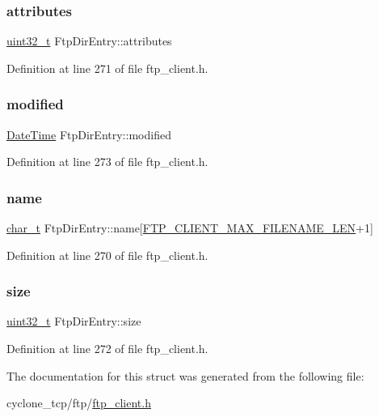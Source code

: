 \subsubsection{\texorpdfstring{attributes}{attributes}}
{\footnotesize\ttfamily \hyperlink{stdint_8h_a435d1572bf3f880d55459d9805097f62}{uint32\+\_\+t} Ftp\+Dir\+Entry\+::attributes}



Definition at line 271 of file ftp\+\_\+client.\+h.

\mbox{\label{structFtpDirEntry_a21b61636bb8282399bba62f16bf016d1}} 
\subsubsection{\texorpdfstring{modified}{modified}}
{\footnotesize\ttfamily \hyperlink{structDateTime}{Date\+Time} Ftp\+Dir\+Entry\+::modified}



Definition at line 273 of file ftp\+\_\+client.\+h.

\mbox{\label{structFtpDirEntry_ac3a25e8ecf4a41cb49e0606e96b5cd44}} 
\subsubsection{\texorpdfstring{name}{name}}
{\footnotesize\ttfamily \hyperlink{compiler__port_8h_a40bb5262bf908c328fbcfbe5d29d0201}{char\+\_\+t} Ftp\+Dir\+Entry\+::name\mbox{[}\hyperlink{ftp__client_8h_a44901b0f271514699875d70f5da8130f}{F\+T\+P\+\_\+\+C\+L\+I\+E\+N\+T\+\_\+\+M\+A\+X\+\_\+\+F\+I\+L\+E\+N\+A\+M\+E\+\_\+\+L\+EN}+1\mbox{]}}



Definition at line 270 of file ftp\+\_\+client.\+h.

\mbox{\label{structFtpDirEntry_ab40397e2e28f76f64b2416a99bb6fada}} 
\subsubsection{\texorpdfstring{size}{size}}
{\footnotesize\ttfamily \hyperlink{stdint_8h_a435d1572bf3f880d55459d9805097f62}{uint32\+\_\+t} Ftp\+Dir\+Entry\+::size}



Definition at line 272 of file ftp\+\_\+client.\+h.



The documentation for this struct was generated from the following file\+:\begin{DoxyCompactItemize}
\item 
cyclone\+\_\+tcp/ftp/\hyperlink{ftp__client_8h}{ftp\+\_\+client.\+h}\end{DoxyCompactItemize}
